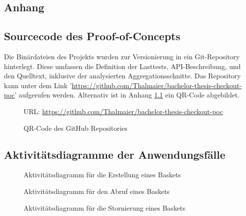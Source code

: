 \begin{anhang}

\chapter{Anhang}

\section{Sourcecode des Proof-of-Concepts}
\label{label:sourcecode}

Die Binärdateien des Projekts wurden zur Versionierung in ein Git-Repository hinterlegt. Diese umfassen die Definition der Lasttests, API-Beschreibung, und den Quelltext, inklusive der analysierten Aggregationsschnitte. Das Repository kann unter dem Link '\url{https://github.com/Thalmaier/bachelor-thesis-checkout-poc}' aufgerufen werden. Alternativ ist in Anhang \ref{fig:Github} ein QR-Code abgebildet.

\begin{figure}[h]
	\centering
	\vspace{0.8cm}
	
	\caption{QR-Code des GitHub Repositories}
	\small URL: \hspace{0.3mm} \url{https://github.com/Thalmaier/bachelor-thesis-checkout-poc}
	\label{fig:Github}
\end{figure}

\section{Aktivitätsdiagramme der Anwendungsfälle}

\begin{figure}[h!]
	\centering
	
	\caption{Aktivitätsdiagramm für die Erstellung eines Baskets}
	\label{fig:SL-Basketcreation}
\end{figure}

\begin{figure}[h!]
	\centering
	
	\caption{Aktivitätsdiagramm für den Abruf eines Baskets}
	\label{fig:SL-Basketabruf}
\end{figure}

\begin{figure}[h!]
	\centering
	
	\caption{Aktivitätsdiagramm für die Stornierung eines Baskets}
	\label{fig:SL-Basketstornierung}
\end{figure}


\end{anhang}
